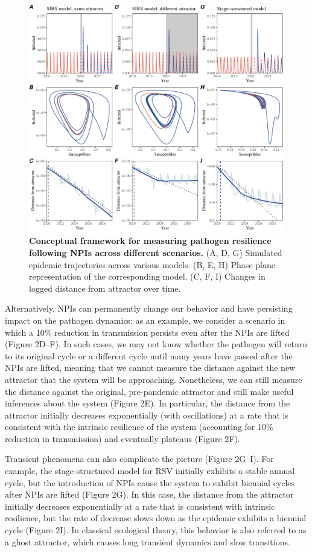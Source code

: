 \documentclass[12pt]{article}
\begin{document}
\begin{figure}[!th]
\includegraphics[width=\textwidth]{../figure2/figure2_simple.pdf}
\caption{
\textbf{Conceptual framework for measuring pathogen resilience following NPIs across different scenarios.}
(A, D, G) Simulated epidemic trajectories across various models. 
(B, E, H) Phase plane representation of the corresponding model.
(C, F, I) Changes in logged distance from attractor over time.
}
\end{figure}

Alternatively, NPIs can permanently change our behavior and have persisting impact on the pathogen dynamics; 
as an example, we consider a scenario in which a 10\% reduction in transmission persists even after the NPIs are lifted (Figure 2D--F).
In such cases, we may not know whether the pathogen will return to its original cycle or a different cycle until many years have passed after the NPIs are lifted, meaning that we cannot measure the distance against the new attractor that the system will be approaching.
Nonetheless, we can still measure the distance against the original, pre-pandemic attractor and still make useful inferences about the system (Figure 2E).
In particular, the distance from the attractor initially decreases exponentially (with oscillations) at a rate that is consistent with the intrinsic resilience of the system (accounting for 10\% reduction in transmission) and eventually plateaus (Figure 2F). 

Transient phenomena can also complicate the picture (Figure 2G--I).
For example, the stage-structured model for RSV initially exhibits a stable annual cycle, but the introduction of NPIs cause the system to exhibit biennial cycles after NPIs are lifted (Figure 2G).
In this case, the distance from the attractor initially decreases exponentially at a rate that is consistent with intrinsic resilience, but the rate of decrease slows down as the epidemic exhibits a biennial cycle (Figure 2I).
In classical ecological theory, this behavior is also referred to as a ghost attractor, which causes long transient dynamics and slow transitions.
\end{document}
